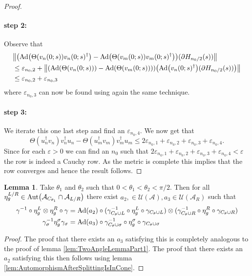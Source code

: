 \documentclass[12pt,a4paper,twoside]{article}
\let\originalleft\left
\let\originalright\right
\renewcommand{\left}{\mathopen{}\mathclose\bgroup\originalleft}
\renewcommand{\right}{\aftergroup\egroup\originalright}
\newcommand{\UU}{\mathcal U}
\renewcommand{\AA}{\mathcal A}
\newcommand{\Ad}[1]{\textrm{Ad}\left(#1\right)}
\newcommand{\Aut}[1]{\textrm{Aut}\left(#1\right)}
\theoremstyle{definition}
\newtheorem{lemma}[theorem]{Lemma}
\numberwithin{equation}{section}
\begin{document}
\begin{proof}
	\paragraph{step 2:}Observe that
	\begin{align}
		&\norm{\left(\Ad{\Theta(v_n(0;s)) v_n(0;s)^\dagger}-\Ad{\Theta(v_m(0;s)) v_m(0;s)^\dagger}\right)(\partial H_{n_0/2}(s))}\\
		&\leq \varepsilon_{n_0,2}+\norm{\left(\Ad{\Theta(v_n(0;s)) }-\Ad{\Theta(v_m(0;s)) }\right)\left(\Ad{v_n(0;s)^\dagger}(\partial H_{n_0/2}(s))\right)}\\
		&\leq \varepsilon_{n_0,2}+\varepsilon_{n_0,3}
	\end{align}
	where $\varepsilon_{n_0,3}$ can now be found using again the same technique.
	\paragraph{step 3:}We iterate this one last step and find an $\varepsilon_{n_0,4}.$
	We now get that
	\begin{equation}
		\Theta(u_n^\dagger v_n)v_n^\dagger u_n-\Theta(u_m^\dagger v_m)v_m^\dagger u_m\leq 2\varepsilon_{n_0,1}+\varepsilon_{n_0,2}+\varepsilon_{n_0,3}+\varepsilon_{n_0,4}.
	\end{equation}
	Since for each $\varepsilon>0$ we can find an $n_0$ such that $2\varepsilon_{n_0,1}+\varepsilon_{n_0,2}+\varepsilon_{n_0,3}+\varepsilon_{n_0,4}<\varepsilon$ the row is indeed a Cauchy row. As the metric is complete this implies that the row converges and hence the result follows.
\end{proof}
\begin{lemma}\label{lem:TwoAngleLemmaPart2}
	Take $\theta_1$ and $\theta_2$ such that $0<\theta_1<\theta_2<\pi/2$. Then for all $\eta_{g}^{L/R}\in\Aut{\AA_{C_{\theta_1}}\cap\AA_{L/R}}$ there exist $a_2,\in\UU(\AA),a_3\in\UU(\AA_R)$ such that
	\begin{align}
	\gamma^{-1}\circ\eta_{g}^L\otimes\eta_{g}^R\circ\gamma&=\Ad{a_2}\circ(\gamma_{C_\theta\cup L}^{-1}\circ \eta_{g}^L \circ\gamma_{C_\theta\cup L})\otimes(\gamma_{C_\theta\cup R}^{-1}\circ\eta_{g}^R\circ\gamma_{C_\theta\cup R})\\
	\gamma_\sigma^{-1}\eta_g^\sigma\gamma_\sigma&=\Ad{a_3}\circ \gamma_{C_\theta\cup \sigma}^{-1}\circ \eta_{g}^\sigma \circ\gamma_{C_\theta\cup \sigma}
	\end{align}
\end{lemma}
\begin{proof}
	The proof that there exists an $a_3$ satisfying this is completely analogous to the proof of lemma \ref{lem:TwoAngleLemmaPart1}. The proof that there exists an $a_2$ satisfying this then follows using lemma \ref{lem:AutomorphismAfterSplittingIsInCone}.
\end{proof}
\end{document}
